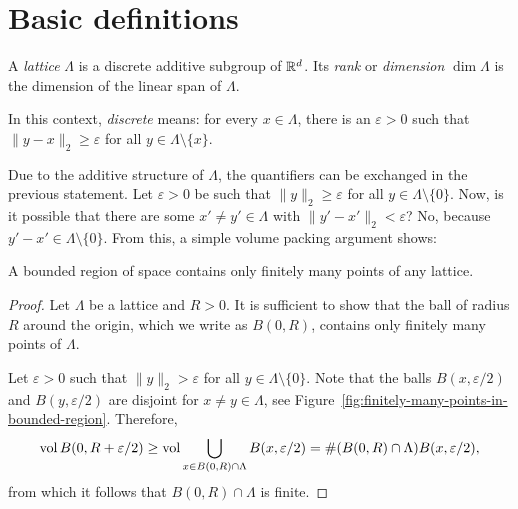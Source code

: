 \section{Basic definitions}

\begin{definition}
  A \emph{lattice} $\Lambda$ is a discrete additive subgroup of $\mathbb{R}^d$.
  Its \emph{rank} or \emph{dimension} $\dim\Lambda$ is the dimension of the linear span of $\Lambda$.
\end{definition}

In this context, \emph{discrete} means:
for every $x \in \Lambda$, there is an $\varepsilon > 0$ such that
$\|y - x\|_2 \geq \varepsilon$ for all $y \in \Lambda \setminus \{ x \}$.

Due to the additive structure of $\Lambda$, the quantifiers can be exchanged in the previous statement.
Let $\varepsilon > 0$ be such that $\|y\|_2 \geq \varepsilon$ for all $y \in \Lambda \setminus \{ 0 \}$.
Now, is it possible that there are some $x' \neq y' \in \Lambda$ with $\|y' - x'\|_2 < \varepsilon$?
No, because $y' - x' \in \Lambda \setminus \{ 0 \}$.
From this, a simple volume packing argument shows:
\begin{lemma}
  \label{lemma:finitely-many-points-in-bounded-region}
  A bounded region of space contains only finitely many points of any lattice.
\end{lemma}
\begin{proof}
  Let $\Lambda$ be a lattice and $R > 0$.
  It is sufficient to show that the ball of radius $R$ around the origin,
  which we write as $B(0,R)$, contains only finitely many points of $\Lambda$.

  Let $\varepsilon > 0$ such that $\|y\|_2 > \varepsilon$ for all $y \in \Lambda \setminus \{ 0 \}$.
  Note that the balls $B(x,\varepsilon/2)$ and $B(y,\varepsilon/2)$ are disjoint for $x \neq y \in \Lambda$,
  see Figure~\ref{fig:finitely-many-points-in-bounded-region}.
  Therefore,
  \[
    \operatorname{vol} B(0,R + \varepsilon/2) \geq \operatorname{vol} \bigcup_{x \in B(0,R)\cap \Lambda} B(x,\varepsilon/2) = \#(B(0,R) \cap \Lambda) B(x,\varepsilon/2),
  \]
  from which it follows that $B(0,R) \cap \Lambda$ is finite.
\end{proof}
